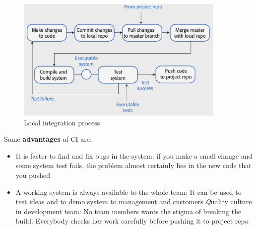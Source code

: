 \documentclass[10pt,a4paper]{report}
\begin{document}
\begin{figure}[h]
	\centering
	\includegraphics[width=0.9\textwidth]{image100}
	\caption{Local integration process}
	\label{image100}
\end{figure} 
Some \textbf{advantages} of CI are:
\begin{itemize}
	\item It is faster to find and fix bugs in the system: if you make a small change and some system test fails, the problem almost certainly lies in the new code that you pushed
	\item A working system is always available to the whole team: It can be used to test ideas and to demo system to management and customers
	\textit Quality culture in development team: No team members wants the stigma of breaking the build.
	Everybody checks her work carefully before pushing it to project repo
	
\end{itemize}
\end{document}
